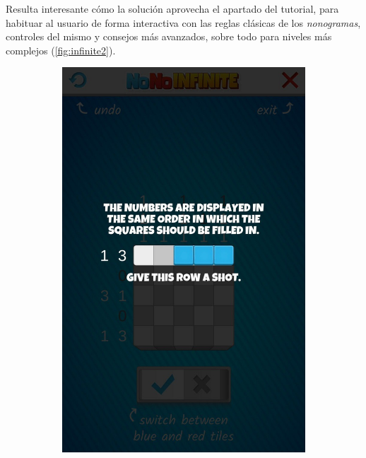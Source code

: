 Resulta interesante cómo la solución aprovecha el apartado del tutorial, para habituar al usuario de forma interactiva con las reglas clásicas de los 
\textit{nonogramas}, controles del mismo y consejos más avanzados, sobre todo para niveles más complejos (\autoref{fig:infinite2}).

\begin{figure}[H]
   \centering
   \begin{subfigure}[b]{0.4\linewidth}
     \includegraphics[width=\linewidth]{images/infinite3.jpg}
   \end{subfigure}
   \begin{subfigure}[b]{0.4\linewidth}

\end{subfigure}
\end{figure}
